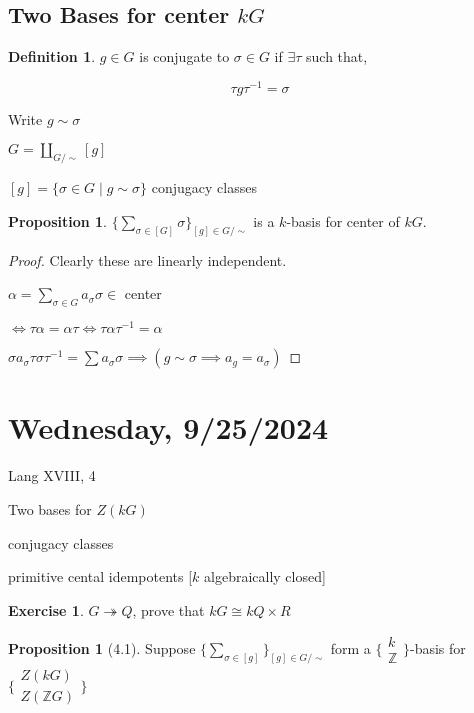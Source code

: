 \documentclass{article}
\theoremstyle{definition}
\newtheorem*{exercise}{Exercise}
\newtheorem*{definition}{Definition}
\newtheorem{proposition}[theorem]{Proposition}
\begin{document}
\subsection*{Two Bases for center \(kG\)}

\begin{definition}
    \(g\in G\) is conjugate to \(\sigma \in G\) if \(\exists \tau\) such that,
    
    \[
        \tau g \tau ^{-1} = \sigma
    \]

    Write \(g \sim \sigma\) 
\end{definition}

\(G = \coprod_{G / \sim}[g]\) 

\([g]= \{ \sigma \in G \mid g \sim \sigma \} \) conjugacy classes 

\begin{proposition}
    \(\{ \sum_{\sigma \in [G]} \sigma \}_{[g]\in G / \sim} \) is a \(k\)-basis for center of \(kG\). 
\end{proposition}

\begin{proof}
    Clearly these are linearly independent.

    \(\alpha = \sum_{\sigma \in G} a_\sigma \sigma \in\) center

    \(\iff \tau \alpha = \alpha \tau \iff \tau \alpha \tau ^{-1} = \alpha\) 

    \(\sigma a_\sigma \tau \sigma \tau ^{-1} = \sum  a_\sigma \sigma \implies (g \sim \sigma \implies a_g = a_\sigma)\) 
\end{proof}


\section*{Wednesday, 9/25/2024}

Lang XVIII, 4

Two bases for \(Z(kG)\)

conjugacy classes

primitive cental idempotents [\(k\) algebraically closed]

\begin{exercise}
    \(G \twoheadrightarrow Q\), prove that \(kG \cong kQ \times R\) 
\end{exercise}

\begin{proposition}
    [4.1] Suppose \(\{ \sum_{\sigma \in [g]}  \}_{[g] \in G / \sim} \) form a \(\{ \substack{k \\ \mathbb{Z}} \} \)-basis for \(\{ \substack{Z(kG) \\ Z(\mathbb{Z} G)} \} \)  
\end{proposition}
\end{document}
